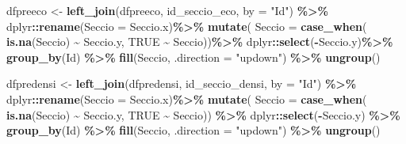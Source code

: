\documentclass[
]{book}
\newenvironment{Shaded}{\begin{snugshade}}{\end{snugshade}}
\newcommand{\AttributeTok}[1]{\textcolor[rgb]{0.13,0.29,0.53}{#1}}
\newcommand{\ConstantTok}[1]{\textcolor[rgb]{0.56,0.35,0.01}{#1}}
\newcommand{\FunctionTok}[1]{\textcolor[rgb]{0.13,0.29,0.53}{\textbf{#1}}}
\newcommand{\NormalTok}[1]{#1}
\newcommand{\OtherTok}[1]{\textcolor[rgb]{0.56,0.35,0.01}{#1}}
\newcommand{\SpecialCharTok}[1]{\textcolor[rgb]{0.81,0.36,0.00}{\textbf{#1}}}
\newcommand{\StringTok}[1]{\textcolor[rgb]{0.31,0.60,0.02}{#1}}
\theoremstyle{definition}
\theoremstyle{definition}
\theoremstyle{definition}
\theoremstyle{definition}
\theoremstyle{remark}
\begin{document}
\begin{Shaded}
\begin{Highlighting}[]
\NormalTok{dfpreeco }\OtherTok{\textless{}{-}} \FunctionTok{left\_join}\NormalTok{(dfpreeco, id\_seccio\_eco, }\AttributeTok{by =} \StringTok{"Id"}\NormalTok{) }\SpecialCharTok{\%\textgreater{}\%} 
\NormalTok{                dplyr}\SpecialCharTok{::}\FunctionTok{rename}\NormalTok{(}\AttributeTok{Seccio =}\NormalTok{ Seccio.x)}\SpecialCharTok{\%\textgreater{}\%} 
                \FunctionTok{mutate}\NormalTok{(}
                    \AttributeTok{Seccio =} \FunctionTok{case\_when}\NormalTok{(}
                      \FunctionTok{is.na}\NormalTok{(Seccio) }\SpecialCharTok{\textasciitilde{}}\NormalTok{ Seccio.y,}
                      \ConstantTok{TRUE} \SpecialCharTok{\textasciitilde{}}\NormalTok{ Seccio))}\SpecialCharTok{\%\textgreater{}\%} 
\NormalTok{                dplyr}\SpecialCharTok{::}\FunctionTok{select}\NormalTok{(}\SpecialCharTok{{-}}\NormalTok{Seccio.y)}\SpecialCharTok{\%\textgreater{}\%} 
                \FunctionTok{group\_by}\NormalTok{(Id) }\SpecialCharTok{\%\textgreater{}\%}
                \FunctionTok{fill}\NormalTok{(Seccio, }\AttributeTok{.direction =} \StringTok{"updown"}\NormalTok{)  }\SpecialCharTok{\%\textgreater{}\%} 
                \FunctionTok{ungroup}\NormalTok{()}

\NormalTok{dfpredensi }\OtherTok{\textless{}{-}} \FunctionTok{left\_join}\NormalTok{(dfpredensi, id\_seccio\_densi, }\AttributeTok{by =} \StringTok{"Id"}\NormalTok{) }\SpecialCharTok{\%\textgreater{}\%} 
\NormalTok{                dplyr}\SpecialCharTok{::}\FunctionTok{rename}\NormalTok{(}\AttributeTok{Seccio =}\NormalTok{ Seccio.x)}\SpecialCharTok{\%\textgreater{}\%} 
                \FunctionTok{mutate}\NormalTok{(}
                    \AttributeTok{Seccio =} \FunctionTok{case\_when}\NormalTok{(}
                      \FunctionTok{is.na}\NormalTok{(Seccio) }\SpecialCharTok{\textasciitilde{}}\NormalTok{ Seccio.y,}
                      \ConstantTok{TRUE} \SpecialCharTok{\textasciitilde{}}\NormalTok{ Seccio)) }\SpecialCharTok{\%\textgreater{}\%} 
\NormalTok{                dplyr}\SpecialCharTok{::}\FunctionTok{select}\NormalTok{(}\SpecialCharTok{{-}}\NormalTok{Seccio.y) }\SpecialCharTok{\%\textgreater{}\%} 
                \FunctionTok{group\_by}\NormalTok{(Id) }\SpecialCharTok{\%\textgreater{}\%}
                \FunctionTok{fill}\NormalTok{(Seccio, }\AttributeTok{.direction =} \StringTok{"updown"}\NormalTok{)  }\SpecialCharTok{\%\textgreater{}\%} 
                \FunctionTok{ungroup}\NormalTok{()}
\end{Highlighting}
\end{Shaded}
\end{document}
